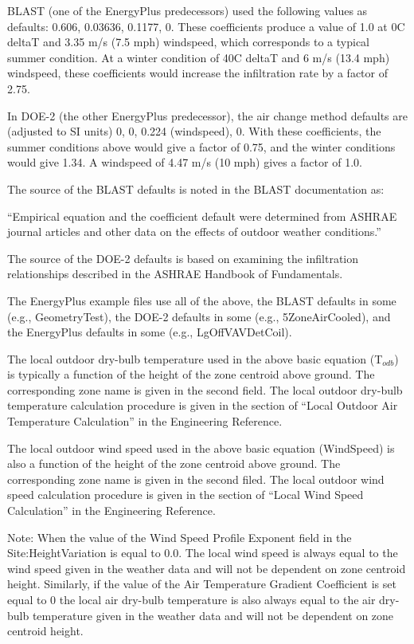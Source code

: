 BLAST (one of the EnergyPlus predecessors) used the following values as defaults: 0.606, 0.03636, 0.1177, 0. These coefficients produce a value of 1.0 at 0C deltaT and 3.35 m/s (7.5 mph) windspeed, which corresponds to a typical summer condition. At a winter condition of 40C deltaT and 6 m/s (13.4 mph) windspeed, these coefficients would increase the infiltration rate by a factor of 2.75.

In DOE-2 (the other EnergyPlus predecessor), the air change method defaults are (adjusted to SI units) 0, 0, 0.224 (windspeed), 0. With these coefficients, the summer conditions above would give a factor of 0.75, and the winter conditions would give 1.34. A windspeed of 4.47 m/s (10 mph) gives a factor of 1.0.

The source of the BLAST defaults is noted in the BLAST documentation as:

``Empirical equation and the coefficient default were determined from ASHRAE journal articles and other data on the effects of outdoor weather conditions.''

The source of the DOE-2 defaults is based on examining the infiltration relationships described in the ASHRAE Handbook of Fundamentals.

The EnergyPlus example files use all of the above, the BLAST defaults in some (e.g., GeometryTest), the DOE-2 defaults in some (e.g., 5ZoneAirCooled), and the EnergyPlus defaults in some (e.g., LgOffVAVDetCoil).

The local outdoor dry-bulb temperature used in the above basic equation (T\(_{odb}\)) is typically a function of the height of the zone centroid above ground. The corresponding zone name is given in the second field. The local outdoor dry-bulb temperature calculation procedure is given in the section of ``Local Outdoor Air Temperature Calculation'' in the Engineering Reference.

The local outdoor wind speed used in the above basic equation (WindSpeed) is also a function of the height of the zone centroid above ground. The corresponding zone name is given in the second filed. The local outdoor wind speed calculation procedure is given in the section of ``Local Wind Speed Calculation'' in the Engineering Reference.

\begin{callout}
  Note: When the value of the Wind Speed Profile Exponent field in the Site:HeightVariation is equal to 0.0. The local wind speed is always equal to the wind speed given in the weather data and will not be dependent on zone centroid height. Similarly, if the value of the Air Temperature Gradient Coefficient is set equal to 0 the local air dry-bulb temperature is also always equal to the air dry-bulb temperature given in the weather data and will not be dependent on zone centroid height.
\end{callout}

